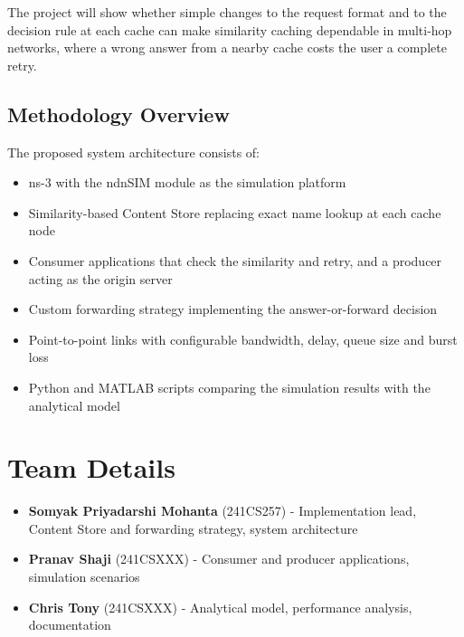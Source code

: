 \documentclass[12pt,a4paper]{article}
\begin{document}
The project will show whether simple changes to the request format and to the decision rule at
each cache can make similarity caching dependable in multi-hop networks, where a wrong answer from
a nearby cache costs the user a complete retry.

\subsection*{Methodology Overview}
The proposed system architecture consists of:
\begin{itemize}
  \item ns-3 with the ndnSIM module as the simulation platform
  \item Similarity-based Content Store replacing exact name lookup at each cache node
  \item Consumer applications that check the similarity and retry, and a producer acting as the
  origin server
  \item Custom forwarding strategy implementing the answer-or-forward decision
  \item Point-to-point links with configurable bandwidth, delay, queue size and burst loss
  \item Python and MATLAB scripts comparing the simulation results with the analytical model
\end{itemize}

\section*{Team Details}
\begin{itemize}
  \item \textbf{Somyak Priyadarshi Mohanta} (241CS257) - Implementation lead, Content Store and
  forwarding strategy, system architecture
  \item \textbf{Pranav Shaji} (241CSXXX) - Consumer and producer applications, simulation scenarios
  \item \textbf{Chris Tony} (241CSXXX) - Analytical model, performance analysis, documentation
\end{itemize}
\end{document}
